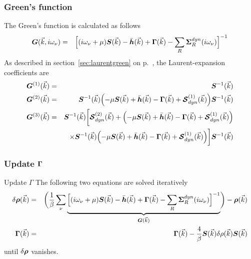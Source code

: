 \documentclass[11pt,a4paper]{report}
\begin{document}
\subsubsection{Green's function}
The Green's function is calculated as follows
\begin{eqnarray}
\bm{G}(\vec{k},i\omega_\nu)&=&
\Bigl[
(i\omega_\nu+\mu)\bm{S}(\vec{k})-\bar{\bm{h}}(\vec{k})+\bm{\Gamma}(\vec{k})
-\sum_R\bm{\Sigma}^{dyn}_R(i\omega_\nu)
\Bigr]^{-1}
\end{eqnarray}
As described in section~\ref{sec:laurentgreen} on
p.~\pageref{sec:laurentgreen}, the Laurent-expansion coefficients are
\begin{eqnarray}
\bm{G}^{(1)}(\vec{k})&=&\bm{S}^{-1}(\vec{k})
\nonumber\\
\bm{G}^{(2)}(\vec{k})&=&\bm{S}^{-1}(\vec{k})
\Bigl(-\mu\bm{S}(\vec{k})+\bar{\bm{h}}(\vec{k})-\bm{\Gamma}(\vec{k})
+\bm{\mathcal{S}}^{(1)}_{dyn}(\vec{k})
\Bigr)
\bm{S}^{-1}(\vec{k})
\nonumber\\
\bm{G}^{(3)}(\vec{k})&=&
\bm{S}^{-1}(\vec{k})
\biggl[
\bm{\mathcal{S}}^{(2)}_{dyn}(\vec{k})+
\Bigl(-\mu\bm{S}(\vec{k})+\bar{\bm{h}}(\vec{k})-\bm{\Gamma}(\vec{k})
+\bm{\mathcal{S}}^{(1)}_{dyn}(\vec{k})\Bigr)
\nonumber\\
&&\times\bm{S}^{-1}(\vec{k})
\Bigl(-\mu\bm{S}(\vec{k})+\bar{\bm{h}}(\vec{k})-\bm{\Gamma}(\vec{k})
+\bm{\mathcal{S}}^{(1)}_{dyn}(\vec{k})\Bigr)
\biggr]
\bm{S}^{-1}(\vec{k})
\nonumber\\
\end{eqnarray}

\subsubsection{Update $\bm{\Gamma}$}
\begin{myshadowminipage}{Update $\Gamma$}
The following two equations are solved iteratively
\begin{eqnarray}
\delta\bm{\rho}(\vec{k})&=&
\biggl(\frac{1}{\beta}\sum_\nu
\underbrace{\Bigl[
(i\omega_\nu+\mu)\bm{S}(\vec{k})-\bar{\bm{h}}(\vec{k})+\bm{\Gamma}(\vec{k})
-\sum_R\bm{\Sigma}^{dyn}_R(i\omega_\nu)
\Bigr]^{-1}}_{\bm{G}(\vec{k})}\biggr)-\bm{\rho}(\vec{k})
\nonumber\\
\bm{\Gamma}(\vec{k})&=&\bm{\Gamma}(\vec{k})-\frac{4}{\beta}\bm{S}(\vec{k})
\delta{\rho}(\vec{k})
\bm{S}(\vec{k})
\end{eqnarray}
until $\delta\bm{\rho}$ vanishes.
\end{myshadowminipage}
\end{document}
